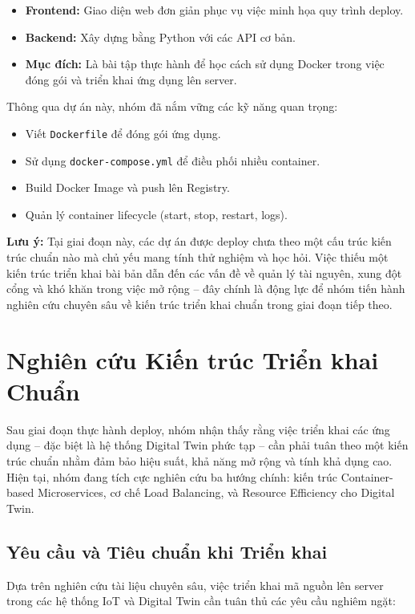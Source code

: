 \documentclass[twocolumn]{article}
\begin{document}
\begin{itemize}[noitemsep]
	\item \textbf{Frontend:} Giao diện web đơn giản phục vụ việc minh họa quy trình deploy.
	\item \textbf{Backend:} Xây dựng bằng Python với các API cơ bản.
	\item \textbf{Mục đích:} Là bài tập thực hành để học cách sử dụng Docker trong việc đóng gói và triển khai ứng dụng lên server.
\end{itemize}

Thông qua dự án này, nhóm đã nắm vững các kỹ năng quan trọng:
\begin{itemize}[noitemsep]
	\item Viết \texttt{Dockerfile} để đóng gói ứng dụng.
	\item Sử dụng \texttt{docker-compose.yml} để điều phối nhiều container.
	\item Build Docker Image và push lên Registry.
	\item Quản lý container lifecycle (start, stop, restart, logs).
\end{itemize}

\textbf{Lưu ý:} Tại giai đoạn này, các dự án được deploy chưa theo một cấu trúc kiến trúc chuẩn nào mà chủ yếu mang tính thử nghiệm và học hỏi. Việc thiếu một kiến trúc triển khai bài bản dẫn đến các vấn đề về quản lý tài nguyên, xung đột cổng và khó khăn trong việc mở rộng -- đây chính là động lực để nhóm tiến hành nghiên cứu chuyên sâu về kiến trúc triển khai chuẩn trong giai đoạn tiếp theo.

\section{Nghiên cứu Kiến trúc Triển khai Chuẩn}

Sau giai đoạn thực hành deploy, nhóm nhận thấy rằng việc triển khai các ứng dụng -- đặc biệt là hệ thống Digital Twin phức tạp -- cần phải tuân theo một kiến trúc chuẩn nhằm đảm bảo hiệu suất, khả năng mở rộng và tính khả dụng cao. Hiện tại, nhóm đang tích cực nghiên cứu ba hướng chính: kiến trúc Container-based Microservices, cơ chế Load Balancing, và Resource Efficiency cho Digital Twin.

\subsection{Yêu cầu và Tiêu chuẩn khi Triển khai}
Dựa trên nghiên cứu tài liệu chuyên sâu, việc triển khai mã nguồn lên server trong các hệ thống IoT và Digital Twin cần tuân thủ các yêu cầu nghiêm ngặt:
\end{document}
